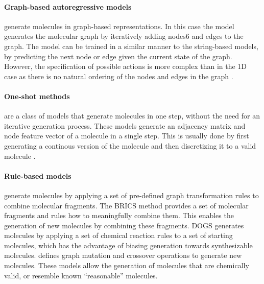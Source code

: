 \paragraph{Graph-based autoregressive models} generate molecules in graph-based
representations. In this case the model generates the molecular graph by iteratively adding nodes6
and edges to the graph. The model can be trained in a similar manner to the string-based models, by
predicting the next node or edge given the current state of the graph. However, the specification of
possible actions is more complex than in the 1D case as there is no natural ordering of the
nodes and edges in the graph \citep{cohen-karlikOvercomingOrderAutoregressive2024,youGraphConvolutionalPolicy2019}.

\paragraph{One-shot methods} are a class of models that generate molecules in one step, without the
need for an iterative generation process. These models generate an adjacency matrix and node feature
vector of a molecule in a single step. This is usually done by first generating a continous version
of the molecule and then discretizing it to a valid molecule \citep{decaoMolGANImplicitGenerative2018,madhawaGraphNVPInvertibleFlow2019,kadurinCornucopiaMeaningfulLeads2016}.

\paragraph{Rule-based models} generate molecules by applying a set of pre-defined graph transformation rules to
combine molecular fragments. The BRICS \citep{degenArtCompilingUsing2008} method provides a set of
molecular fragments and rules how to meaningfully combine them. This enables the generation of new
molecules by combining these fragments. DOGS \citep{hartenfellerDOGSReactionDrivenNovo2012}
generates molecules by applying a set of chemical reaction rules to a set of starting molecules,
which has the advantage of biasing generation towards synthesizable molecules.\@
\citet{jensenGraphbasedGeneticAlgorithm2019} defines graph mutation and crossover operations to
generate new molecules. These models allow the generation of molecules that are chemically valid, or
resemble known ``reasonable'' molecules.


